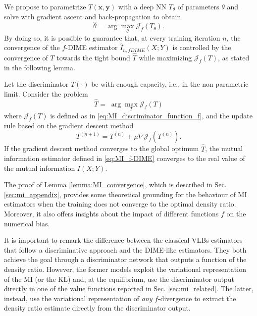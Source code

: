 We propose to parametrize $T(\mathbf{x},\mathbf{y})$ with a deep NN $T_{\theta}$ of parameters $\theta$ and solve with gradient ascent and back-propagation to obtain
\begin{equation}
\hat{\theta} = \arg \max_{\theta} \mathcal{J}_f(T_{\theta}).
\end{equation}
By doing so, it is possible to guarantee that, at every training iteration $n$, the convergence of the $f$-DIME estimator $\hat{I}_{n,fDIME}(X;Y)$ is controlled by the convergence of $T$ towards the tight bound $\hat{T}$ while maximizing $\mathcal{J}_f(T)$, as stated in the following lemma.
\begin{lemma}
\label{lemma:MI_convergence}
Let the discriminator $T(\cdot)$ be with enough capacity, i.e., in the non parametric limit. Consider the problem
\begin{equation}
\hat{T} =  \; \arg \max_T \mathcal{J}_{f}(T)
\label{eq:MI_Lemma4_problem}
\end{equation}
where $\mathcal{J}_{f}(T)$ is defined as in \eqref{eq:MI_discriminator_function_f},
and the update rule based on the gradient descent method
\begin{equation}
T^{(n+1)} = T^{(n)} + \mu \nabla \mathcal{J}_{f}(T^{(n)}).
\end{equation}
If the gradient descent method converges to the global optimum $\hat{T}$, the mutual information estimator defined in \eqref{eq:MI_f-DIME}
converges to the real value of the mutual information $I(X;Y)$.
\end{lemma}
The proof of Lemma \ref{lemma:MI_convergence}, which is described in Sec. \ref{sec:mi_appendix}, provides some theoretical grounding for the behaviour of MI estimators when the training does not converge to the optimal density ratio. Moreover, it also offers insights about the impact of different functions $f$ on the numerical bias.

It is important to remark the difference between the classical VLBs estimators that follow a discriminative approach and the DIME-like estimators. They both achieve the goal through a discriminator network that outputs a function of the density ratio. However, the former models exploit the variational representation of the MI (or the KL) and, at the equilibrium, use the discriminator output directly in one of the value functions reported in Sec. \ref{sec:mi_related}. The latter, instead, use the variational representation of \textit{any} $f$-divergence to extract the density ratio estimate directly from the discriminator output.

